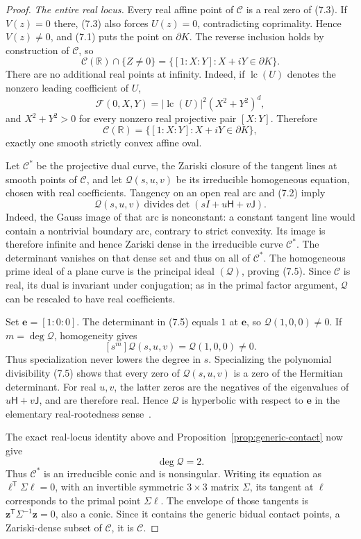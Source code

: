\documentclass[preprints,article,submit,oneauthor]{Definitions/mdpi}
\numberwithin{equation}{section}
\newcommand{\R}{\mathbb R}
\begin{document}
\begin{proof}
\medskip\noindent\emph{The entire real locus.}
Every real affine point of \(\mathscr C\) is a real zero of (7.3).  If
\(V(z)=0\) there, (7.3) also forces \(U(z)=0\), contradicting coprimality.
Hence \(V(z)\neq0\), and (7.1) puts the point on \(\partial K\).  The reverse
inclusion holds by construction of \(\mathscr C\), so
\[
 \mathscr C(\R)\cap\{Z\neq0\}
 =\{[1:X:Y]:X+iY\in\partial K\}.
\]
There are no additional real points at infinity.  Indeed, if
\(\operatorname{lc}(U)\) denotes the nonzero leading coefficient of \(U\),
\[
 \mathscr F(0,X,Y)=|\operatorname{lc}(U)|^2
                    (X^2+Y^2)^d,                    \tag{7.4}
\]
and \(X^2+Y^2>0\) for every nonzero real projective pair \([X:Y]\).  Therefore
\[
 \mathscr C(\R)=\{[1:X:Y]:X+iY\in\partial K\},
\]
exactly one smooth strictly convex affine oval.

Let \(\mathscr C^*\) be the projective dual curve, the Zariski closure of the
tangent lines at smooth points of \(\mathscr C\), and let
\(\mathscr Q(s,u,v)\) be its irreducible homogeneous equation, chosen with
real coefficients.  Tangency on an open real arc and (7.2) imply
\[
 \mathscr Q(s,u,v)\ \text{divides}
 \det(sI+u\mathsf H+v\mathsf J).                     \tag{7.5}
\]
Indeed, the Gauss image of that arc is nonconstant: a constant tangent line
would contain a nontrivial boundary arc, contrary to strict convexity.  Its
image is therefore infinite and hence Zariski dense in the irreducible curve
\(\mathscr C^*\).  The determinant vanishes on that dense set and thus on all
of \(\mathscr C^*\).  The homogeneous prime ideal of a plane curve is the
principal ideal \((\mathscr Q)\), proving (7.5).  Since \(\mathscr C\) is real,
its dual is invariant under conjugation; as in the primal factor argument,
\(\mathscr Q\) can be rescaled to have real coefficients.

Set \(\mathbf e=[1:0:0]\).  The determinant in (7.5) equals \(1\) at
\(\mathbf e\), so \(\mathscr Q(1,0,0)\neq0\).  If
\(m=\deg\mathscr Q\), homogeneity gives
\[
 [s^m]\mathscr Q(s,u,v)=\mathscr Q(1,0,0)\neq0.
\]
Thus specialization never lowers the degree in \(s\).  Specializing the
polynomial divisibility (7.5) shows that every zero of
\(\mathscr Q(s,u,v)\) is a zero of the Hermitian determinant.  For real
\(u,v\), the latter zeros are the negatives of the eigenvalues of
\(u\mathsf H+v\mathsf J\), and are therefore real.  Hence \(\mathscr Q\) is
hyperbolic with respect to \(\mathbf e\) in the elementary real-rootedness
sense~\cite{Garding1959,HeltonVinnikov2007}.

The exact real-locus identity above and
Proposition~\ref{prop:generic-contact} now give
\[
 \deg\mathscr Q=2.                                    \tag{7.6}
\]
Thus \(\mathscr C^*\) is an irreducible conic and is nonsingular.  Writing its
equation as
\(\boldsymbol\ell^{\mathsf T}\Sigma\boldsymbol\ell=0\), with an invertible
symmetric \(3\times3\) matrix \(\Sigma\), its tangent at
\(\boldsymbol\ell\) corresponds to the primal point
\(\Sigma\boldsymbol\ell\).  The envelope of those tangents is
\(\mathbf z^{\mathsf T}\Sigma^{-1}\mathbf z=0\), also a conic.  Since it
contains the generic bidual contact points, a Zariski-dense subset of
\(\mathscr C\), it is \(\mathscr C\).


\end{proof}
\end{document}
